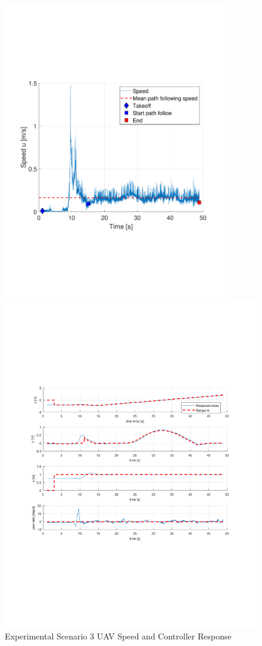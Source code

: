 \documentclass[numbered,pdftex]{ohio-etd}
\begin{document}
\pagebreak
\begin{figure}[H]
	\centering
	\includegraphics[trim = 0 150 0 200, clip, width=10cm]{Figures/results/compareFigures/3u}
	
	\centering
	\includegraphics[trim = 65 210 0 200, clip, width=16cm]{Figures/results/compareFigures/3Controller}
	\caption{Experimental Scenario 3 UAV Speed and Controller Response}
	\label{fig:3Controller}
\end{figure}
\end{document}
